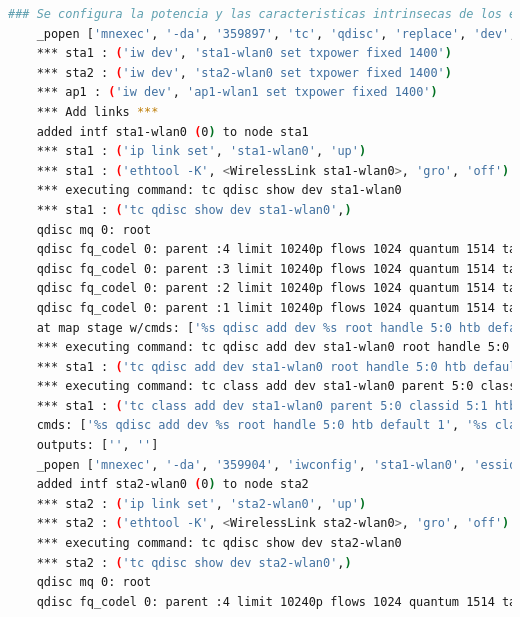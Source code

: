 \begin{lstlisting}[language= bash, style=Consola, caption={Traza de la puesta en marcha del escenario básico},label=code:trazatopobasic]
    ### Se configura la potencia y las caracteristicas intrinsecas de los enlaces 
    _popen ['mnexec', '-da', '359897', 'tc', 'qdisc', 'replace', 'dev', 'ap1-wlan1', 'root', 'handle', '2:', 'netem', 'rate', '54.0000mbit', 'latency', '1.00ms'] 360049*** ap1 : ('tc qdisc add dev ap1-wlan1 parent 2:1 handle 10: pfifo limit 1000',)
    *** sta1 : ('iw dev', 'sta1-wlan0 set txpower fixed 1400')
    *** sta2 : ('iw dev', 'sta2-wlan0 set txpower fixed 1400')
    *** ap1 : ('iw dev', 'ap1-wlan1 set txpower fixed 1400')
    *** Add links ***
    added intf sta1-wlan0 (0) to node sta1
    *** sta1 : ('ip link set', 'sta1-wlan0', 'up')
    *** sta1 : ('ethtool -K', <WirelessLink sta1-wlan0>, 'gro', 'off')
    *** executing command: tc qdisc show dev sta1-wlan0
    *** sta1 : ('tc qdisc show dev sta1-wlan0',)
    qdisc mq 0: root 
    qdisc fq_codel 0: parent :4 limit 10240p flows 1024 quantum 1514 target 5ms interval 100ms memory_limit 32Mb ecn drop_batch 64 
    qdisc fq_codel 0: parent :3 limit 10240p flows 1024 quantum 1514 target 5ms interval 100ms memory_limit 32Mb ecn drop_batch 64 
    qdisc fq_codel 0: parent :2 limit 10240p flows 1024 quantum 1514 target 5ms interval 100ms memory_limit 32Mb ecn drop_batch 64 
    qdisc fq_codel 0: parent :1 limit 10240p flows 1024 quantum 1514 target 5ms interval 100ms memory_limit 32Mb ecn drop_batch 64 
    at map stage w/cmds: ['%s qdisc add dev %s root handle 5:0 htb default 1', '%s class add dev %s parent 5:0 classid 5:1 htb rate 11.000000Mbit burst 15k']
    *** executing command: tc qdisc add dev sta1-wlan0 root handle 5:0 htb default 1
    *** sta1 : ('tc qdisc add dev sta1-wlan0 root handle 5:0 htb default 1',)
    *** executing command: tc class add dev sta1-wlan0 parent 5:0 classid 5:1 htb rate 11.000000Mbit burst 15k
    *** sta1 : ('tc class add dev sta1-wlan0 parent 5:0 classid 5:1 htb rate 11.000000Mbit burst 15k',)
    cmds: ['%s qdisc add dev %s root handle 5:0 htb default 1', '%s class add dev %s parent 5:0 classid 5:1 htb rate 11.000000Mbit burst 15k'] 
    outputs: ['', ''] 
    _popen ['mnexec', '-da', '359904', 'iwconfig', 'sta1-wlan0', 'essid', 'new-ssid', 'ap', '00:00:00:00:00:01'] 360059
    added intf sta2-wlan0 (0) to node sta2
    *** sta2 : ('ip link set', 'sta2-wlan0', 'up')
    *** sta2 : ('ethtool -K', <WirelessLink sta2-wlan0>, 'gro', 'off')
    *** executing command: tc qdisc show dev sta2-wlan0
    *** sta2 : ('tc qdisc show dev sta2-wlan0',)
    qdisc mq 0: root 
    qdisc fq_codel 0: parent :4 limit 10240p flows 1024 quantum 1514 target 5ms interval 100ms memory_limit 32Mb ecn drop_batch 64 

\end{lstlisting}
